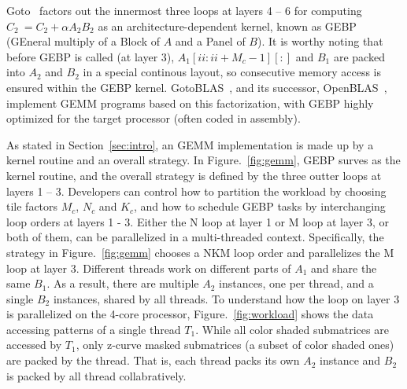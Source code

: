 Goto~\cite{gotogemm} factors out the innermost three loops at layers 4 -- 6 for
computing $C_2\ = C_2 + \alpha A_2 B_2$ as an architecture-dependent kernel,
known as  GEBP (GEneral multiply of a Block of $A$ and a Panel of $B$).
It is worthy noting that before GEBP is called (at layer 3),
$A_1[ii:ii+M_c-1][:]$ and $B_1$ are packed into $A_2$ and $B_2$
in a special continous layout,
so consecutive memory access is ensured within the GEBP kernel.
GotoBLAS~\cite{gotoblas}, and its successor, OpenBLAS~\cite{openblas},
implement GEMM programs based on this factorization,
with GEBP highly optimized for the target processor (often coded in assembly).

As stated in Section~\ref{sec:intro}, an GEMM implementation
is made up by a kernel routine and an overall strategy.
In Figure.~\ref{fig:gemm}, GEBP surves as the kernel routine,
and the overall strategy is defined by the three outter loops at layers 1 -- 3.
Developers can control how to partition the workload by choosing
tile factors $M_c$, $N_c$ and $K_c$,
and how to schedule GEBP tasks by interchanging loop orders at layers 1 - 3.
Either the N loop at layer 1 or M loop at layer 3, or both of them,
can be parallelized in a multi-threaded context.
Specifically, the strategy in Figure.~\ref{fig:gemm} chooses a NKM loop order and
parallelizes the M loop at layer 3.
Different threads work on different parts of $A_1$
and share the same $B_1$.
As a result, there are multiple $A_2$ instances, one per thread,
and a single $B_2$ instances, shared by all threads.
To understand how the loop on layer 3 is parallelized on the 4-core processor, 
Figure.~\ref{fig:workload} shows the data accessing patterns of a single thread $T_1$.
While all color shaded submatrices are accessed by $T_1$,
only z-curve masked submatrices (a subset of color shaded ones)
are packed by the thread.
That is, each thread packs its own $A_2$ instance and 
$B_2$ is packed by all thread collabratively.

